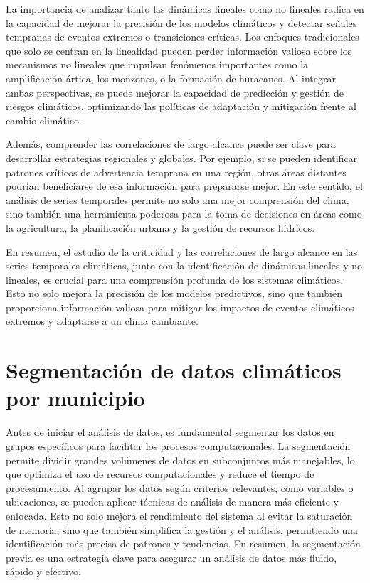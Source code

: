 \documentclass[11pt]{article}
\begin{document}
La importancia de analizar tanto las dinámicas lineales como no lineales
radica en la capacidad de mejorar la precisión de los modelos climáticos
y detectar señales tempranas de eventos extremos o transiciones
críticas. Los enfoques tradicionales que solo se centran en la
linealidad pueden perder información valiosa sobre los mecanismos no
lineales que impulsan fenómenos importantes como la amplificación
ártica, los monzones, o la formación de huracanes. Al integrar ambas
perspectivas, se puede mejorar la capacidad de predicción y gestión de
riesgos climáticos, optimizando las políticas de adaptación y mitigación
frente al cambio climático.

Además, comprender las correlaciones de largo alcance puede ser clave
para desarrollar estrategias regionales y globales. Por ejemplo, si se
pueden identificar patrones críticos de advertencia temprana en una
región, otras áreas distantes podrían beneficiarse de esa información
para prepararse mejor. En este sentido, el análisis de series temporales
permite no solo una mejor comprensión del clima, sino también una
herramienta poderosa para la toma de decisiones en áreas como la
agricultura, la planificación urbana y la gestión de recursos hídricos.

En resumen, el estudio de la criticidad y las correlaciones de largo
alcance en las series temporales climáticas, junto con la identificación
de dinámicas lineales y no lineales, es crucial para una comprensión
profunda de los sistemas climáticos. Esto no solo mejora la precisión de
los modelos predictivos, sino que también proporciona información
valiosa para mitigar los impactos de eventos climáticos extremos y
adaptarse a un clima cambiante.

    \hypertarget{segmentaciuxf3n-de-datos-climuxe1ticos-por-municipio}{%
\section{Segmentación de datos climáticos por
municipio}\label{segmentaciuxf3n-de-datos-climuxe1ticos-por-municipio}}

    Antes de iniciar el análisis de datos, es fundamental segmentar los
datos en grupos específicos para facilitar los procesos computacionales.
La segmentación permite dividir grandes volúmenes de datos en
subconjuntos más manejables, lo que optimiza el uso de recursos
computacionales y reduce el tiempo de procesamiento. Al agrupar los
datos según criterios relevantes, como variables o ubicaciones, se
pueden aplicar técnicas de análisis de manera más eficiente y enfocada.
Esto no solo mejora el rendimiento del sistema al evitar la saturación
de memoria, sino que también simplifica la gestión y el análisis,
permitiendo una identificación más precisa de patrones y tendencias. En
resumen, la segmentación previa es una estrategia clave para asegurar un
análisis de datos más fluido, rápido y efectivo.
\end{document}
